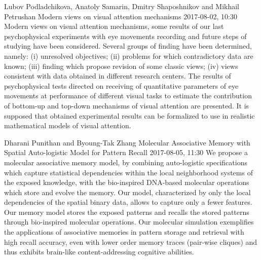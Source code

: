 \documentclass[10pt,fleqn,openany]{book} %
\begin{document}
\begin{enumerate}
		
		\paperabstract
		{Lubov Podladchikova, Anatoly Samarin, Dmitry Shaposhnikov and Mikhail Petrushan}
		{Modern views on visual attention mechanisms}
		{2017-08-02, 10:30}
		{Modern views on visual attention mechanisms, some results of our last psychophysical experiments with eye movements recording and future steps of studying have been considered. Several groups of finding have been determined, namely: (i) unresolved objectives; (ii) problems for which contradictory data are known; (iii) finding which propose revision of some classic views; (iv) views consistent with data obtained in different research centers. The results of psychophysical tests directed on receiving of quantitative parameters of eye movements at performance of different visual tasks to estimate the contribution of bottom-up and top-down mechanisms of visual attention are presented. It is supposed that obtained experimental results can be formalized to use in realistic mathematical models of visual attention.}
		
		
		\paperabstract
		{Dharani Punithan and Byoung-Tak Zhang}
		{Molecular Associative Memory with Spatial Auto-logistic Model for Pattern Recall}
		{2017-08-05, 11:30}
		{We propose a molecular associative memory model, by combining auto-logistic specifications which capture statistical dependencies within the local neighborhood systems of the exposed knowledge, with the bio-inspired DNA-based molecular operations which store and evolve the memory. Our model, characterized by only the local dependencies of the spatial binary data, allows to capture only a fewer features. Our memory model stores the exposed patterns and recalls the stored patterns through bio-inspired molecular operations. Our molecular simulation exemplifies the applications of associative memories in pattern storage and retrieval with high recall accuracy, even with lower order memory traces (pair-wise cliques) and thus exhibits brain-like content-addressing cognitive abilities.}
		

\end{enumerate}
\end{document}
